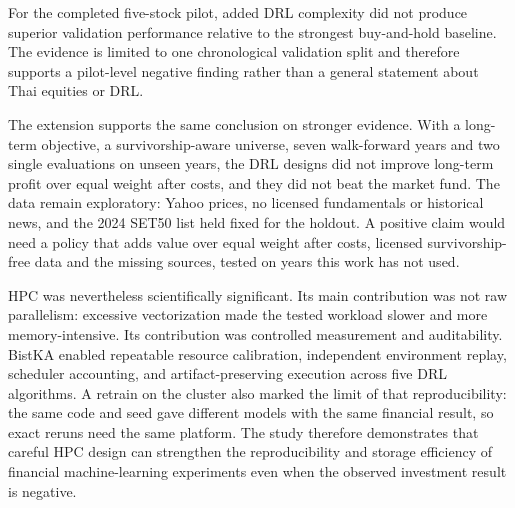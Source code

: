 \documentclass[12pt,a4paper,oneside]{book}
\begin{document}
For the completed five-stock pilot, added DRL complexity did not produce superior validation performance relative to the strongest buy-and-hold baseline. The evidence is limited to one chronological validation split and therefore supports a pilot-level negative finding rather than a general statement about Thai equities or DRL.

The extension supports the same conclusion on stronger evidence. With a long-term objective, a survivorship-aware universe, seven walk-forward years and two single evaluations on unseen years, the DRL designs did not improve long-term profit over equal weight after costs, and they did not beat the market fund. The data remain exploratory: Yahoo prices, no licensed fundamentals or historical news, and the 2024 SET50 list held fixed for the holdout. A positive claim would need a policy that adds value over equal weight after costs, licensed survivorship-free data and the missing sources, tested on years this work has not used.

HPC was nevertheless scientifically significant. Its main contribution was not raw parallelism: excessive vectorization made the tested workload slower and more memory-intensive. Its contribution was controlled measurement and auditability. BistKA enabled repeatable resource calibration, independent environment replay, scheduler accounting, and artifact-preserving execution across five DRL algorithms. A retrain on the cluster also marked the limit of that reproducibility: the same code and seed gave different models with the same financial result, so exact reruns need the same platform. The study therefore demonstrates that careful HPC design can strengthen the reproducibility and storage efficiency of financial machine-learning experiments even when the observed investment result is negative.

\clearpage
\end{document}
